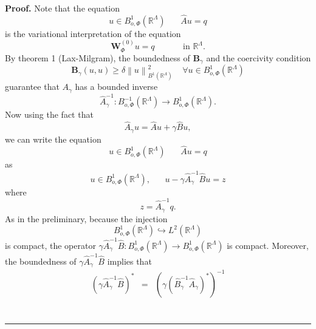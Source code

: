 \documentclass{article}
\newenvironment{proof}[1][Proof]{\noindent\textbf{#1.} }{\ \rule{0.5em}{0.5em}}
\begin{document}
\begin{proof}
Note that the equation 
\begin{equation*}
u\in B_{o,\Phi }^{1}(\mathbb{R}^{\Lambda })\ \ \ \ \ \ \ \ \hat{A}u=q
\end{equation*}%
is the variational interpretation of the equation 
\begin{equation*}
\mathbf{W}_{\Phi }^{\left( 0\right) }u=q\;\;\;\;\ \ \ \ \ \ \ \ \ \ \text{in 
}\mathbb{R}^{\Lambda }.
\end{equation*}%
By theorem 1 (Lax-Milgram), the boundedness of $\mathbf{B}_{\gamma }$ and
the coercivity condition 
\begin{equation*}
\mathbf{B}_{\gamma }(u,u)\geq \delta \left\| u\right\| _{B^{1}(\mathbb{R}%
^{\Lambda })}^{2}\;\;\;\;\forall u\in B_{o,\Phi }^{1}(\mathbb{R}^{\Lambda })
\end{equation*}%
guarantee that $A_{\gamma }$ has a bounded inverse 
\begin{equation*}
\hat{A}_{\gamma }^{-1}:B_{o,\Phi }^{-1}(\mathbb{R}^{\Lambda })\rightarrow
B_{o,\Phi }^{1}(\mathbb{R}^{\Lambda }).
\end{equation*}%
Now using the fact that 
\begin{equation*}
\hat{A}_{\gamma }u=\hat{A}u+\gamma \hat{B}u,
\end{equation*}%
we can write the equation 
\begin{equation*}
u\in B_{o,\Phi }^{1}(\mathbb{R}^{\Lambda })\ \ \ \ \ \ \ \ \hat{A}u=q
\end{equation*}%
as 
\begin{equation}
u\in B_{o,\Phi }^{1}(\mathbb{R}^{\Lambda }),\;\;\;\;\;\;u-\gamma \hat{A}%
_{\gamma }^{-1}\hat{B}u=z
\end{equation}%
where%
\begin{equation}
z=\hat{A}_{\gamma }^{-1}q.
\end{equation}%
As in the preliminary, because the injection 
\begin{equation*}
B_{o,\Phi }^{1}(\mathbb{R}^{\Lambda })\hookrightarrow L^{2}(\mathbb{R}%
^{\Lambda })
\end{equation*}%
is compact, the operator $\gamma \hat{A}_{\gamma }^{-1}\hat{B}:B_{o,\Phi
}^{1}(\mathbb{R}^{\Lambda })\rightarrow B_{o,\Phi }^{1}(\mathbb{R}^{\Lambda
})$ is compact. Moreover, the boundedness of $\gamma \hat{A}_{\gamma }^{-1}%
\hat{B}$ implies that 
\begin{eqnarray}
\left( \gamma \hat{A}_{\gamma }^{-1}\hat{B}\right) ^{\ast } &=&\left( \gamma
\left( \hat{B}_{\gamma }^{-1}\hat{A}_{\gamma }\right) ^{\ast }\right) ^{-1}
\\

\end{eqnarray}
\end{proof}
\end{document}
